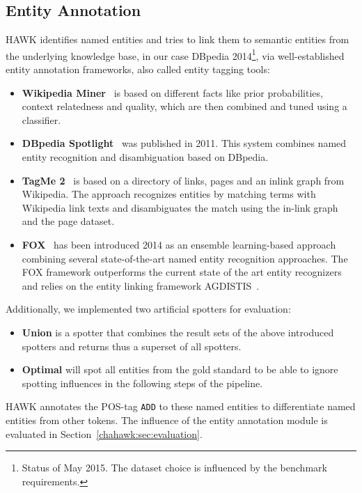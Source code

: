 \subsection{Entity Annotation}
HAWK identifies named entities and tries to link them to semantic entities from the underlying knowledge base, in our case DBpedia 2014\footnote{Status of May 2015. The dataset choice is influenced by the benchmark requirements.}, via well-established entity annotation frameworks, also called entity tagging tools:
\begin{itemize}
\item \textbf{Wikipedia Miner}~\cite{milne2008learning} is based on different facts like prior probabilities, context relatedness and quality, which are then combined and tuned using a classifier.
\item \textbf{DBpedia Spotlight}~\cite{spotlight} %
was published in 2011. 
This system combines named entity recognition and disambiguation based on DBpedia.
\item \textbf{TagMe 2}~\cite{TagMe2} is based on a directory of links, pages and an inlink graph from Wikipedia.
The approach recognizes entities by matching terms with Wikipedia link texts and disambiguates the match using the in-link graph and the page dataset.
\item \textbf{FOX}~\cite{FOX} has been introduced 2014 as an ensemble learning-based approach combining several state-of-the-art named entity recognition approaches. 
The FOX framework outperforms the current state of the art entity recognizers and relies on the entity linking framework AGDISTIS~\cite{agdistis_iswc}.
\end{itemize}
Additionally, we implemented two artificial spotters for evaluation:
\begin{itemize}
\item \textbf{Union} is a spotter that combines the result sets of the above introduced spotters and returns thus a superset of all spotters.
\item \textbf{Optimal} will spot all entities from the gold standard to be able to ignore spotting influences in the following steps of the pipeline.
\end{itemize}

HAWK annotates the POS-tag \texttt{ADD} to these named entities to differentiate named entities from other tokens. %
The influence of the entity annotation module is evaluated in Section~\ref{chahawk:sec:evaluation}.

